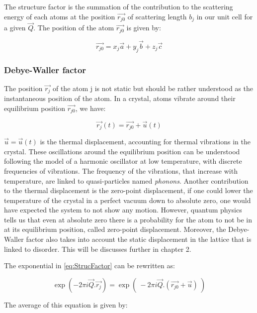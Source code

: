 The structure factor is the summation of the contribution to the scattering energy of each atoms at the position $\vec{r_{j0}}$ of scattering length $b_j$ in our unit cell for a given $\vec{Q}$.
The position of the atom $\vec{r_{j0}}$ is given by:

\begin{equation}
    \label{eq:AtomPos}
    \vec{r_{j0}} = x_j\vec{a} + y_j\vec{b} + z_j\vec{c}
\end{equation}

\subsubsection{Debye-Waller factor}

The position $\vec{r_j}$ of the atom j is not static but should be rather understood as the instantaneous position of the atom. In a crystal, atoms vibrate around their equilibrium position $\vec{r_{j0}}$, we have:

\begin{equation}
    \vec{r_j}(t)=\vec{r_{j0}} + \vec{u}(t)
\end{equation}{}

$\vec{u} = \vec{u}(t)$ is the thermal displacement, accounting for thermal vibrations in the crystal. These oscillations around the equilibrium position can be understood following the model of a harmonic oscillator at low temperature, with discrete frequencies of vibrations. The frequency of the vibrations, that increase with temperature, are linked to quasi-particles named \textit{phonons}.
Another contribution to the thermal displacement is the zero-point displacement, if one could lower the temperature of the crystal in a perfect vacuum down to absolute zero, one would have expected the system to not show any motion. However, quantum physics tells us that even at absolute zero there is a probability for the atom to not be in at its equilibrium position, called zero-point displacement.
Moreover, the Debye-Waller factor also takes into account the static displacement in the lattice that is linked to disorder. This will be discusses further in chapter 2.

The exponential in \eqref{eq:StrucFactor} can be rewritten as:

\begin{equation}
    \exp{(-2\pi i \vec{Q}.\vec{r_j})} = \exp{(\ -2\pi i \vec{Q}.(\vec{r_{j0}} + \vec{u})\ )}
\end{equation}{}

The average of this equation is given by:


